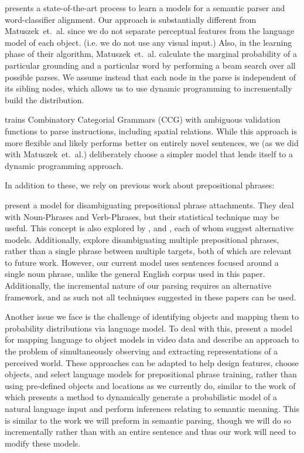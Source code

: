 \documentclass[letterpaper,10pt]{article}
\begin{document}
\citet{UW_RSE_ICML2012} presents a state-of-the-art process to learn a models for a semantic parser and word-classifier alignment. Our approach is substantially different from Matuszek~et.~al. since we do not separate perceptual features from the language model of each object. (i.e. we do not use any visual input.) Also, in the learning phase of their algorithm, Matuszek~et.~al. calculate the marginal probability of a particular grounding and a particular word by performing a beam search over all possible parses. We assume instead that each node in the parse is independent of its sibling nodes, which allows us to use dynamic programming to incrementally build the distribution.

\citet{artzi2013weakly} trains Combinatory Categorial Grammars (CCG) with ambiguous validation functions to parse instructions, including spatial relations. While this approach is more flexible and likely performs better on entirely novel sentences, we (as we did with Matuszek~et.~al.) deliberately choose a simpler model that lends itself to a dynamic programming approach.


In addition to these, we rely on previous work about prepositional phrases:

\citet{collins95} present a model for disambiguating prepositional phrase attachments. They deal with Noun-Phrases and Verb-Phrases, but their statistical technique may be useful. This concept is also explored by \citet{ratna98}, and \citet{brill94}, each of whom suggest alternative models. Additionally, \citet{merlo97} explore disambiguating multiple prepositional phrases, rather than a single phrase between multiple targets, both of which are relevant to future work. However, our current model uses sentences focused around a single noun phrase, unlike the general English corpus used in this paper. Additionally, the incremental nature of our parsing requires an alternative framework, and as such not all techniques suggested in these papers can be used.

Another issue we face is the challenge of identifying objects and mapping them to probability distributions via language model. To deal with this, \citet{barbu13} present a model for mapping language to object models in video data and \citet{UW_RSE_ICML2012} describe an approach to the problem of simultaneously observing and extracting representations of a perceived world. These approaches can be adapted to help design features, choose objects, and select language models for prepositional phrase training, rather than using pre-defined objects and locations as we currently do, similar to the work of \citet{tellex2011understanding} which presents a method to dynamically generate a probabilistic model of a natural language input and perform inferences relating to semantic meaning. This is similar to the work we will preform in semantic parsing, though we will do so incrementally rather than with an entire sentence and thus our work will need to modify these models.
\end{document}
